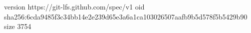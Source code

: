 version https://git-lfs.github.com/spec/v1
oid sha256:6cda9485f3c34bb14e2e239d65e3a6a1ca103026507aafb9b5d578f5b5429b90
size 3754
